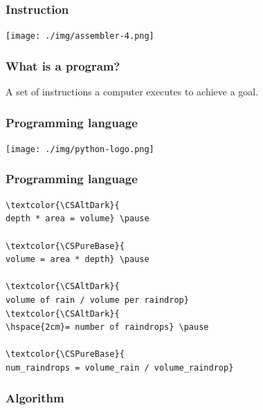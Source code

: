 \documentclass[11pt]{beamer}
\begin{document}
\begin{frame}[fragile]
  \frametitle{Instruction}

  \texttt{[image: ./img/assembler-4.png]}
\end{frame}


\begin{frame}
  \frametitle{What is a program?}
  \Enlarge

  \begin{itemize} \pause
    \myitem A set of instructions a computer executes to achieve a goal.
  \end{itemize}
\end{frame}


\begin{frame}[fragile]
  \frametitle{Programming language}

  \texttt{[image: ./img/python-logo.png]} \hfill\\
  \hspace{5mm}{\small Python (logo)}
\end{frame}


\begin{frame}[fragile]
  \frametitle{Programming language}
  \Enlarge
  \begin{Verbatim}[commandchars=\\\{\}]
\textcolor{\CSAltDark}{
depth * area = volume} \pause

\textcolor{\CSPureBase}{
volume = area * depth} \pause

\textcolor{\CSAltDark}{
volume of rain / volume per raindrop}
\textcolor{\CSAltDark}{
\hspace{2cm}= number of raindrops} \pause

\textcolor{\CSPureBase}{
num_raindrops = volume_rain / volume_raindrop}
  \end{Verbatim}
\end{frame}


\iffalse
\begin{frame}[fragile]
  \frametitle{Algorithm}
\end{frame}
\end{document}
